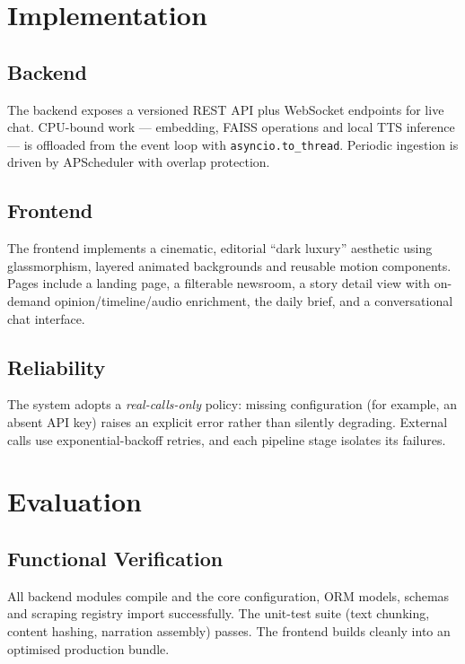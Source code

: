 \documentclass[11pt,a4paper]{article}
\begin{document}
\section{Implementation}

\subsection{Backend}
The backend exposes a versioned REST API plus WebSocket endpoints for live
chat. CPU-bound work --- embedding, FAISS operations and local TTS inference
--- is offloaded from the event loop with \texttt{asyncio.to\_thread}. Periodic
ingestion is driven by APScheduler with overlap protection.

\subsection{Frontend}
The frontend implements a cinematic, editorial ``dark luxury'' aesthetic using
glassmorphism, layered animated backgrounds and reusable motion components.
Pages include a landing page, a filterable newsroom, a story detail view with
on-demand opinion/timeline/audio enrichment, the daily brief, and a
conversational chat interface.

\subsection{Reliability}
The system adopts a \emph{real-calls-only} policy: missing configuration (for
example, an absent API key) raises an explicit error rather than silently
degrading. External calls use exponential-backoff retries, and each pipeline
stage isolates its failures.

\section{Evaluation}

\subsection{Functional Verification}
All backend modules compile and the core configuration, ORM models, schemas and
scraping registry import successfully. The unit-test suite (text chunking,
content hashing, narration assembly) passes. The frontend builds cleanly into
an optimised production bundle.
\end{document}
